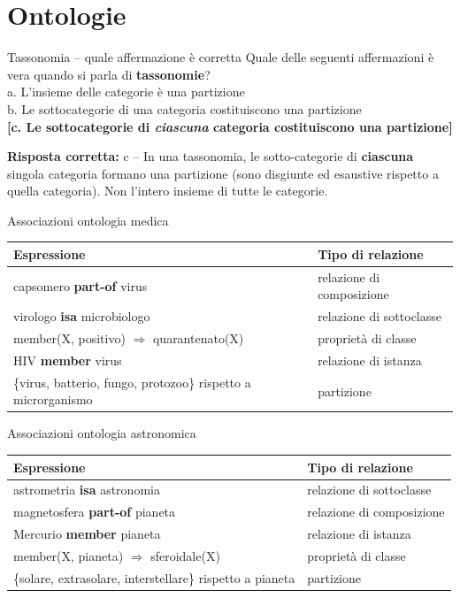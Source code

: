 \documentclass[12pt,a4paper]{article}
\newcommand{\corr}[1]{\textcolor{green!55!black}{\textbf{[#1]}}}
\newcommand{\risp}[1]{\begin{abox}\textbf{Risposta corretta: }#1\end{abox}}
\begin{document}
\section{Ontologie}

\begin{qbox}{Tassonomia -- quale affermazione è corretta}
Quale delle seguenti affermazioni è vera quando si parla di \textbf{tassonomie}?
\\[4pt]
a. L'insieme delle categorie è una partizione\\
b. Le sottocategorie di una categoria costituiscono una partizione\\
\corr{c. Le sottocategorie di \emph{ciascuna} categoria costituiscono una partizione}
\end{qbox}
\risp{c -- In una tassonomia, le sotto-categorie di \textbf{ciascuna} singola categoria formano una partizione (sono disgiunte ed esaustive rispetto a quella categoria). Non l'intero insieme di tutte le categorie.}

\bigskip
\begin{assocbox}{Associazioni ontologia medica}
\begin{tabular}{ll}
\toprule
\textbf{Espressione} & \textbf{Tipo di relazione} \\
\midrule
capsomero \textbf{part-of} virus & relazione di composizione \\
virologo \textbf{isa} microbiologo & relazione di sottoclasse \\
member(X, positivo) $\Rightarrow$ quarantenato(X) & proprietà di classe \\
HIV \textbf{member} virus & relazione di istanza \\
\{virus, batterio, fungo, protozoo\} rispetto a microrganismo & partizione \\
\bottomrule
\end{tabular}
\end{assocbox}

\bigskip
\begin{assocbox}{Associazioni ontologia astronomica}
\begin{tabular}{ll}
\toprule
\textbf{Espressione} & \textbf{Tipo di relazione} \\
\midrule
astrometria \textbf{isa} astronomia & relazione di sottoclasse \\
magnetosfera \textbf{part-of} pianeta & relazione di composizione \\
Mercurio \textbf{member} pianeta & relazione di istanza \\
member(X, pianeta) $\Rightarrow$ sferoidale(X) & proprietà di classe \\
\{solare, extrasolare, interstellare\} rispetto a pianeta & partizione \\
\bottomrule
\end{tabular}
\end{assocbox}
\end{document}
